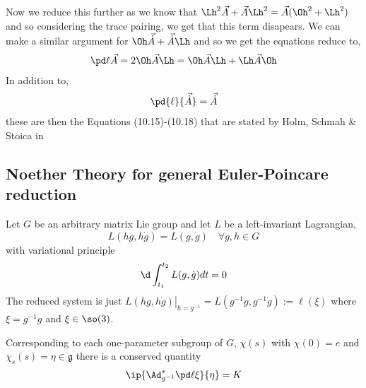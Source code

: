 Now we reduce this further as we know that $\Lh^2\vec A + \vec A\Lh^2 = \vec A(\Oh^2 + \Lh^2)$ and so considering the trace pairing, we get that this term disapears. We can make a similar argument for $\Oh\vec{\dot A} + \vec{\dot A}\Lh$ and so we get the equations reduce to,
\begin{align}
  \pd \ell {\vec A} = 2\Oh \vec A\Lh = \Oh\vec A\Lh + \Lh\vec A\Oh
\end{align}
In addition to,
\begin{align}
  \pd{\ell}{\vec{\dot A}} = \vec{\dot A}
\end{align}
these are then the Equations (10.15)-(10.18) that are stated by Holm, Schmah \& Stoica in \cite{holm_schmah_stoica_2009}

\subsection{Noether Theory for general Euler-Poincare reduction}
Let $G$ be an arbitrary matrix Lie group and let $L$ be a left-invariant Lagrangian,
$$ L(hg, h\dot g) = L(g, \dot g) \quad \forall g, h \in G$$
with variational principle
$$ \d \int_{t_1}^{t_2} L(g, \dot g)dt = 0 $$
The reduced system is just $\left.L(hg, h\dot g)\right|_{h = g^{-1}} = L(g^{-1}g, g^{-1}\dot g) := \ell(\xi)$ where $\xi = g^{-1}g$ and $\xi \in \so(3)$.
\begin{nthm}
  Corresponding to each one-parameter subgroup of $G$, $\chi(s)$ with $\chi(0) = e$ and $\chi_s (s) = \eta \in \mathfrak{g}$ there is a conserved quantity
  $$ \ip{\Ad^*_{g^{-1}} \pd \ell \xi}{\eta} = K $$
\end{nthm}
